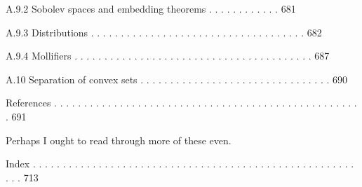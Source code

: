 A.9.2 Sobolev spaces and embedding theorems . . . . . . . . . . . . 681



A.9.3 Distributions . . . . . . . . . . . . . . . . . . . . . . . . . . . . . . . . . . . . 682



A.9.4 Mollifiers . . . . . . . . . . . . . . . . . . . . . . . . . . . . . . . . . . . . . . . . 687



A.10 Separation of convex sets . . . . . . . . . . . . . . . . . . . . . . . . . . . . . . . . 690



References . . . . . . . . . . . . . . . . . . . . . . . . . . . . . . . . . . . . . . . . . . . . . . . . . . . . 691

Perhaps I ought to read through more of these even.

Index . . . . . . . . . . . . . . . . . . . . . . . . . . . . . . . . . . . . . . . . . . . . . . . . . . . . . . . . . 713